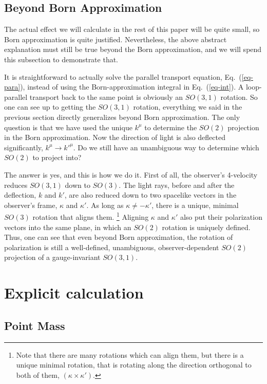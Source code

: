 \documentclass[aps,showpacs,onecolumn,floats,prd,superscriptaddress,nofootinbib]{revtex4}
\begin{document}
\subsection{Beyond Born Approximation}

The actual effect we will calculate in the rest of this paper will be quite small, so Born approximation is quite justified. 
Nevertheless, the above abstract explanation must still be true beyond the Born approximation, and we will spend this subsection to demonstrate that. 

It is straightforward to actually solve the parallel transport equation, Eq.~(\ref{eq-para}), instead of using the Born-approximation integral in Eq.~(\ref{eq-int}). 
A loop-parallel transport back to the same point is obviously an $SO(3,1)$ rotation.
So one can see up to getting the $SO(3,1)$ rotation, everything we said in the previous section directly generalizes beyond Born approximation.
The only question is that we have used the unique $k^\mu$ to determine the $SO(2)$ projection in the Born approximation.
Now the direction of light is also deflected significantly, $k^\mu \rightarrow k'^\mu$. 
Do we still have an unambiguous way to determine which $SO(2)$ to project into?

The answer is yes, and this is how we do it. 
First of all, the observer's 4-velocity reduces $SO(3,1)$ down to $SO(3)$.
The light rays, before and after the deflection, $k$ and $k'$, are also reduced down to two spacelike vectors in the observer's frame, $\kappa$ and $\kappa'$.
As long as $\kappa\neq-\kappa'$, there is a unique, minimal $SO(3)$ rotation that aligns them.
\footnote{Note that there are many rotations which can align them, but there is a unique minimal rotation, that is rotating along the direction orthogonal to both of them, $(\kappa\times\kappa')$.}
Aligning $\kappa$ and $\kappa'$ also put their polarization vectors into the same plane, in which an $SO(2)$ rotation is uniquely defined. 
Thus, one can see that even beyond Born approximation, the rotation of polarization is still a well-defined, unambiguous, observer-dependent $SO(2)$ projection of a gauge-invariant $SO(3,1)$.

\section{Explicit calculation}
\label{sec-Sch}

\subsection{Point Mass}
\end{document}
